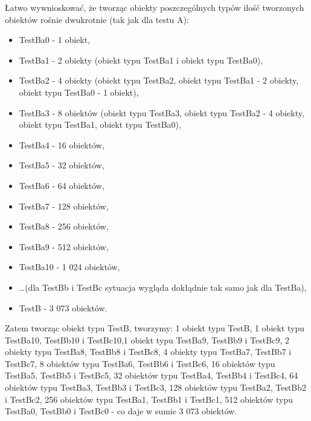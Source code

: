 \documentclass[12pt]{article}
\begin{document}
Łatwo wywnioskować, że tworząc obiekty poszczególnych typów ilość tworzonych obiektów rośnie dwukrotnie (tak jak dla testu A):
\begin{itemize}
	\item TestBa0 - 1 obiekt,
	\item TestBa1 - 2 obiekty (obiekt typu TestBa1 i obiekt typu TestBa0),
	\item TestBa2 - 4 obiekty (obiekt typu TestBa2, obiekt typu TestBa1 - 2 obiekty, obiekt typu TestBa0 - 1 obiekt),
	\item TestBa3 - 8 obiektów (obiekt typu TestBa3, obiekt typu TestBa2 - 4 obiekty, obiekt typu TestBa1, obiekt typu TestBa0),
	\item TestBa4 - 16 obiektów,
	\item TestBa5 - 32 obiektów,
	\item TestBa6 - 64 obiektów,
	\item TestBa7 - 128 obiektów,
	\item TestBa8 - 256 obiektów,
	\item TestBa9 - 512 obiektów,
	\item TestBa10 - 1 024 obiektów,
	\item \ldots (dla TestBb i TestBc sytuacja wygląda dokłądnie tak samo jak dla TestBa),
	\item TestB - 3 073 obiektów.
\end{itemize}
Zatem tworząc obiekt typu TestB, tworzymy: 1 obiekt typu TestB, 1 obiekt typu TestBa10, TestBb10 i TestBc10,1 obiekt typu TestBa9, TestBb9 i TestBc9, 2 obiekty typu TestBa8, TestBb8 i TestBc8, 4 obiekty typu TestBa7, TestBb7 i TestBc7, 8 obiektów typu TestBa6, TestBb6 i TestBc6, 16 obiektów typu TestBa5, TestBb5 i TestBc5, 32 obiektów typu TestBa4, TestBb4 i TestBc4, 64 obiektów typu TestBa3, TestBb3 i TestBc3, 128 obiektów typu TestBa2, TestBb2 i TestBc2, 256 obiektów typu TestBa1, TestBb1 i TestBc1, 512 obiektów typu TestBa0, TestBb0 i TestBc0 - co daje w sumie 3 073 obiektów.
\end{document}
